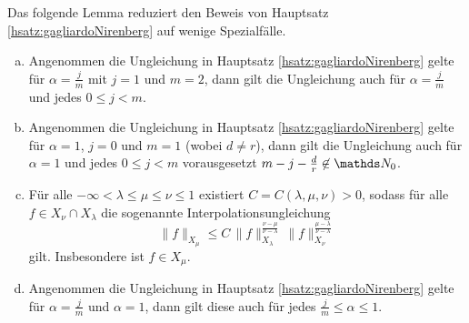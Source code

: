 Das folgende Lemma reduziert den Beweis von Hauptsatz \ref{hsatz:gagliardoNirenberg} auf wenige Spezialfälle.

\begin{lem}
  \label{lem:reducingGagliardo}
  \begin{enumerate}[a)]
    \item Angenommen die Ungleichung in Hauptsatz \ref{hsatz:gagliardoNirenberg} gelte für $\alpha = \frac{j}{m}$ mit $j = 1$ und $m = 2$, dann gilt die Ungleichung auch für $\alpha = \frac{j}{m}$ und jedes $0 \leq j < m$.

    \item Angenommen die Ungleichung in Hauptsatz \ref{hsatz:gagliardoNirenberg} gelte für $\alpha = 1$, $j = 0$ und $m = 1$ (wobei $d \neq r$), dann gilt die Ungleichung auch für $\alpha = 1$ und jedes $0 \leq j < m$ vorausgesetzt $m - j - \frac{d}{r} \not\in \N_0$.
      
    \item Für alle $-\infty < \lambda \leq \mu \leq \nu \leq 1$ existiert $C = C(\lambda, \mu, \nu) > 0$, sodass für alle $f \in X_\nu \cap X_\lambda$ die sogenannte Interpolationsungleichung
      $$
      \| f\|_{X_\mu} \leq C \, \|f\|_{X_\lambda}^{\frac{\nu - \mu}{\nu - \lambda}} \, \|f\|_{X_\nu}^{\frac{\mu - \lambda}{\nu - \lambda}}
      $$
      gilt.
      Insbesondere ist $f \in X_\mu$.

    \item Angenommen die Ungleichung in Hauptsatz \ref{hsatz:gagliardoNirenberg} gelte für $\alpha = \frac{j}{m}$ und $\alpha = 1$, dann gilt diese auch für jedes $\frac{j}{m} \leq \alpha \leq 1$.
  \end{enumerate}
\end{lem}

